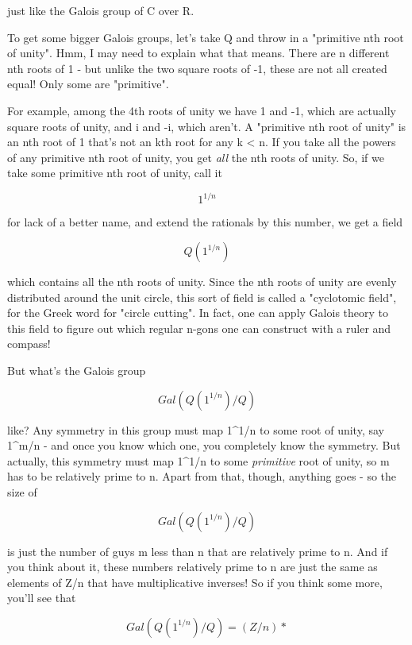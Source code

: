 just like the Galois group of C over R.  

To get some bigger Galois groups, let's take Q and throw in a "primitive 
nth root of unity".  Hmm, I may need to explain what that means.  There 
are n different nth roots of 1 - but unlike the two square roots of -1, 
these are not all created equal!  Only some are "primitive".

For example, among the 4th roots of unity we have 1 and -1, which are 
actually square roots of unity, and i and -i, which aren't.  A "primitive 
nth root of unity" is an nth root of 1 that's not an kth root for any
k < n.  If you take all the powers of any primitive nth root of unity,
you get \emph{all} the nth roots of unity.  So, if we take some primitive nth 
root of unity, call it


$$

1^{1/n}
$$
    
for lack of a better name, and extend the rationals by this number, 
we get a field


$$

Q(1^{1/n})
$$
    
which contains all the nth roots of unity.  Since the nth roots of unity
are evenly distributed around the unit circle, this sort of field is called
a "cyclotomic field", for the Greek word for "circle cutting".  In fact,
one can apply Galois theory to this field to figure out which regular
n-gons one can construct with a ruler and compass!

But what's the Galois group


$$

Gal(Q(1^{1/n})/Q)
$$
    
like?   Any symmetry in this group must map 1^{1/n} 
to some root of unity, 
say 1^{m/n} - and once you know which one, you completely know the 
symmetry.   But actually, this symmetry must map 1^{1/n} 
to some \emph{primitive}
root of unity, so m has to be relatively prime to n.  Apart from that, 
though, anything goes - so the size of 


$$

Gal(Q(1^{1/n})/Q)
$$
    
is just the number of guys m less than n that are relatively prime to n.  And 
if you think about it, these numbers relatively prime to n are just the 
same as elements of Z/n that have multiplicative inverses!  So if you think
some more, you'll see that


$$

Gal(Q(1^{1/n})/Q) = (Z/n)*
$$
    
